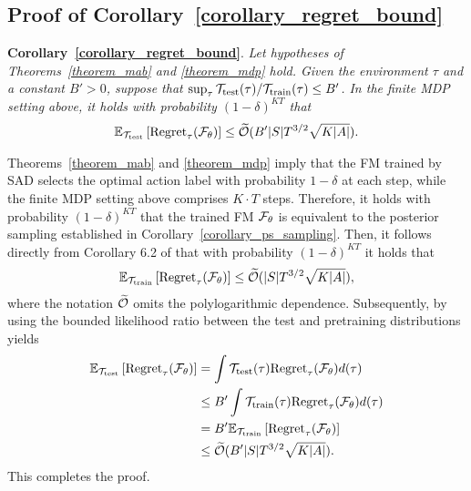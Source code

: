 \subsection{Proof of Corollary~\ref{corollary_regret_bound}}
\label{appendix_omit_proof_corollary_regret_bound}

\textbf{Corollary~\ref{corollary_regret_bound}}.
\textit{
Let hypotheses of Theorems~\ref{theorem_mab}  and \ref{theorem_mdp} hold.
%
Given the environment $\tau$ and a constant $B' > 0$, suppose that $\sup_{\tau} {{\mathcal T}_{\text{test}}(\tau)}/{{\mathcal T}_{\text{train}}(\tau)} \leq B'$. In the finite MDP setting above, it holds with probability $(1-\delta)^{KT}$ that
\begin{align}\label{eqn_regret_dpt}
       {\ensuremath{\mathbb E}}_{{\mathcal T}_{\text{test}}} \left[ \text{Regret}_\tau({\mathcal F}_{\theta}) \right]  \leq \widetilde{{\mathcal O}} (B' |S| T^{3/2} \sqrt{K |A|}).
\end{align}
%
}
%
\begin{myproof}
%
    Theorems~\ref{theorem_mab} and \ref{theorem_mdp} imply that the FM trained by SAD selects the optimal action label with probability $1-\delta$ at each step, while the finite MDP setting above comprises $K \cdot T$ steps. Therefore, it holds with probability $(1-\delta)^{KT}$ that the trained FM ${\mathcal F}_\theta$ is equivalent to the posterior sampling established in Corollary~\ref{corollary_ps_sampling}. Then, it follows directly from Corollary 6.2 of \citep{lee2024supervised} that with probability $(1-\delta)^{KT}$ it holds that
    \begin{align}
       {\ensuremath{\mathbb E}}_{{\mathcal T}_{\text{train}}} \left[ \text{Regret}_\tau({\mathcal F}_{\theta}) \right]  \leq \widetilde{{\mathcal O}} ( |S| T^{3/2} \sqrt{K |A|}),
\end{align}
    where the notation $\widetilde{{\mathcal O}}$ omits the polylogarithmic dependence. Subsequently, by using the bounded likelihood ratio between the test and pretraining distributions yields
    \begin{align}
        {\ensuremath{\mathbb E}}_{{\mathcal T}_{\text{test}}} \left[ \text{Regret}_\tau({\mathcal F}_{\theta}) \right] &= \int {\ensuremath{\mathcal T}}_{\text{test}}(\tau) \text{Regret}_\tau({\mathcal F}_{\theta}) d(\tau) \\
        &\leq B' \int {\ensuremath{\mathcal T}}_{\text{train}}(\tau) \text{Regret}_\tau({\mathcal F}_{\theta}) d(\tau) \\
        &=B' {\mathbb E}_{{\mathcal T}_{\text{train}}} \left[ \text{Regret}_\tau({\mathcal F}_{\theta}) \right] \\
        &\leq \widetilde{{\mathcal O}} (B' |S| T^{3/2} \sqrt{K |A|}).
    \end{align}
    This completes the proof.
\end{myproof}
%




